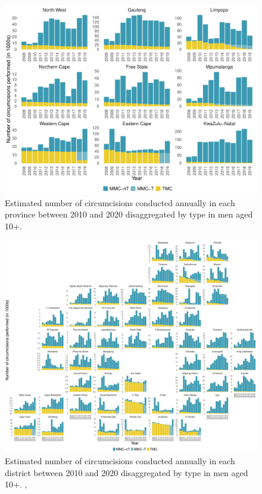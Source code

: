 \documentclass{article}
\begin{document}
\begin{appendix}
\begin{figure}[H]
	\centering
	\includegraphics[width = \linewidth]{Figures/suppmat/VMMCs/MCsPerformed_Province}
	\caption{Estimated number of circumcisions conducted annually in each province between 2010 and 2020 disaggregated by type in men aged 10+.}
\end{figure}	


\begin{figure}[H]
	\centering
	\includegraphics[width = \linewidth]{Figures/suppmat/VMMCs/MCsPerformed_District}
	\caption{Estimated number of circumcisions conducted annually in each district between 2010 and 2020 disaggregated by type in men aged 10+. ,}
\end{figure}


\end{appendix}
\end{document}
